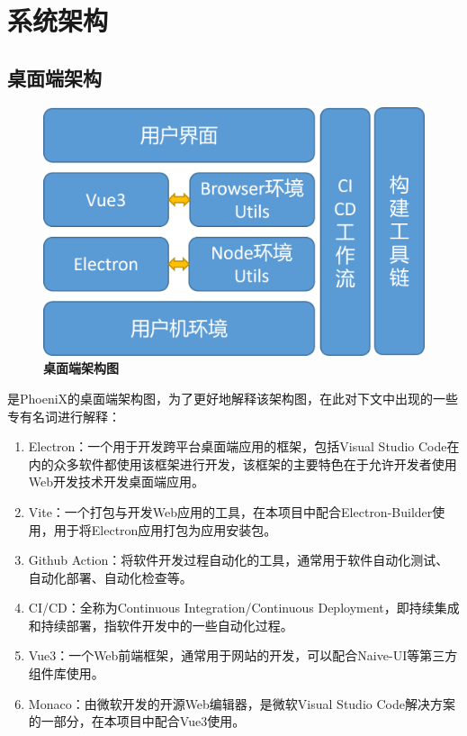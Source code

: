 \chapter{系统架构}

\section{桌面端架构}

\begin{figure}[H]
  \centering
  \includegraphics[scale=0.75]{figure/front_arch.png}
  \caption{\textbf{桌面端架构图}}
  \label{fig:front_arch}
\end{figure}

是PhoeniX的桌面端架构图，为了更好地解释该架构图，在此对下文中出现的一些专有名词进行解释：

\begin{enumerate}
  \item Electron：一个用于开发跨平台桌面端应用的框架，包括Visual Studio Code在内的众多软件都使用该框架进行开发，该框架的主要特色在于允许开发者使用Web开发技术开发桌面端应用。
  \item Vite：一个打包与开发Web应用的工具，在本项目中配合Electron-Builder使用，用于将Electron应用打包为应用安装包。
  \item Github Action：将软件开发过程自动化的工具，通常用于软件自动化测试、自动化部署、自动化检查等。
  \item CI/CD：全称为Continuous Integration/Continuous Deployment，即持续集成和持续部署，指软件开发中的一些自动化过程。
  \item Vue3：一个Web前端框架，通常用于网站的开发，可以配合Naive-UI等第三方组件库使用。
  \item Monaco：由微软开发的开源Web编辑器，是微软Visual Studio Code解决方案的一部分，在本项目中配合Vue3使用。
\end{enumerate}

